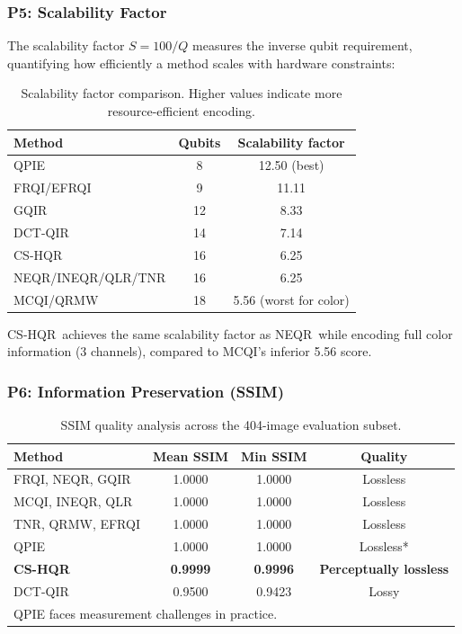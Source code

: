 \documentclass{ipol}
\newcommand{\cshqr}{\textsc{CS-HQR}}
\newcommand{\neqr}{\textsc{NEQR}}
\newcommand{\gqir}{\textsc{GQIR}}
\newcommand{\mcqi}{\textsc{MCQI}}
\begin{document}
\FloatBarrier
\subsubsection{P5: Scalability Factor}

The scalability factor $S = 100/Q$ measures the inverse qubit requirement,
quantifying how efficiently a method scales with hardware constraints:

\begin{table}[H]
\begin{center}
\begin{tabular}{lcc}
\hline
Method & Qubits & Scalability factor \\
\hline
QPIE & 8 & 12.50 (best) \\
FRQI/EFRQI & 9 & 11.11 \\
\gqir & 12 & 8.33 \\
DCT-QIR & 14 & 7.14 \\
\rowcolor{green!15}
\cshqr & 16 & 6.25 \\
\neqr/INEQR/QLR/TNR & 16 & 6.25 \\
\mcqi/QRMW & 18 & 5.56 (worst for color) \\
\hline
\end{tabular}
\caption{Scalability factor comparison. Higher values indicate more
  resource-efficient encoding.}
\label{tab:scalability}
\end{center}
\end{table}

\cshqr\ achieves the same scalability factor as \neqr\ while encoding full
color information (3 channels), compared to \mcqi's inferior 5.56 score.

\FloatBarrier
\subsubsection{P6: Information Preservation (SSIM)}

\begin{table}[H]
\begin{center}
\begin{tabular}{lccc}
\hline
Method & Mean SSIM & Min SSIM & Quality \\
\hline
FRQI, NEQR, GQIR & 1.0000 & 1.0000 & Lossless \\
MCQI, INEQR, QLR & 1.0000 & 1.0000 & Lossless \\
TNR, QRMW, EFRQI & 1.0000 & 1.0000 & Lossless \\
QPIE             & 1.0000 & 1.0000 & Lossless* \\
\rowcolor{green!15}
\textbf{\cshqr}  & \textbf{0.9999} & \textbf{0.9996} & \textbf{Perceptually lossless} \\
DCT-QIR          & 0.9500 & 0.9423 & Lossy \\
\hline
\multicolumn{4}{l}{\footnotesize *QPIE faces measurement challenges in practice.}
\end{tabular}
\caption{SSIM quality analysis across the 404-image evaluation subset.}
\label{tab:ssim_analysis}
\end{center}
\end{table}
\end{document}
